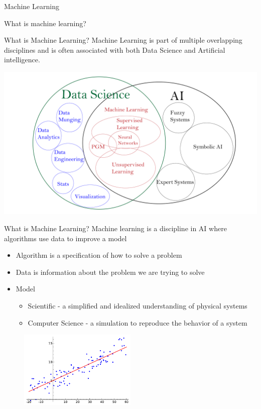 \documentclass[10pt]{beamer}
\begin{document}
\begin{frame}{Machine Learning}
	\begin{center}
     What is machine learning?
	\end{center}
\end{frame}

\begin{frame}{What is Machine Learning?}
Machine Learning is part of multiple overlapping disciplines and is often associated with both Data Science and Artificial intelligence.
	\begin{center}
		\includegraphics[width=1.2\textwidth, center, trim=-8cm -8cm 0 0cm]{images/overlapping_dis.pdf}
	\end{center}
\end{frame}

\begin{frame}{What is Machine Learning?}
Machine learning is a discipline in AI where algorithms use data to improve a model
	\begin{itemize}
		\pause
		\item Algorithm is a specification of how to solve a problem
		\pause
		\item Data is information about the problem we are trying to solve
		\pause
		\item Model
		\begin{itemize}
			\pause
			\item Scientific - a simplified and idealized understanding of physical systems
			\pause
			\item Computer Science - a simulation to reproduce the behavior of a system
		\end{itemize}
	\end{itemize}
	\begin{figure}
		\includegraphics[width=0.5\textwidth, center, trim=0cm 0cm 0 0cm]{images/Linear_regression.pdf}
	\end{figure}
\end{frame}
\end{document}
